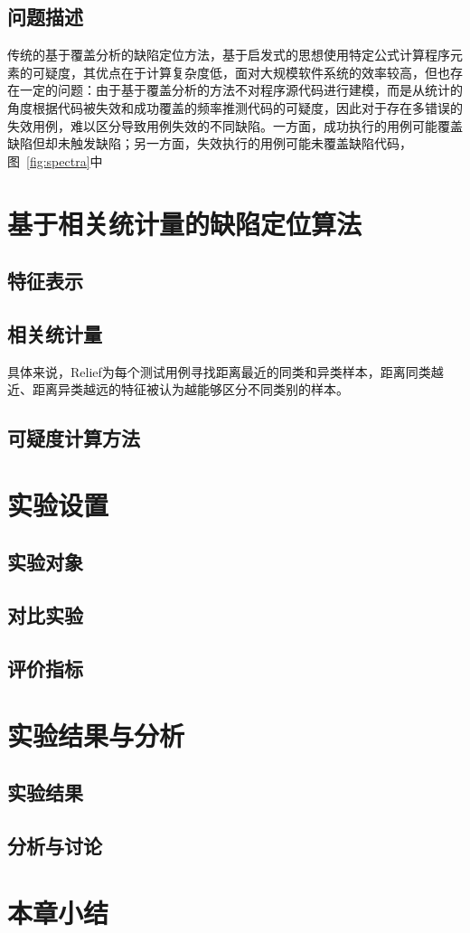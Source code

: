 \subsection{问题描述}
传统的基于覆盖分析的缺陷定位方法，基于启发式的思想使用特定公式计算程序元素的可疑度，其优点在于计算复杂度低，面对大规模软件系统的效率较高，但也存在一定的问题：由于基于覆盖分析的方法不对程序源代码进行建模，而是从统计的角度根据代码被失效和成功覆盖的频率推测代码的可疑度，因此对于存在多错误的失效用例，难以区分导致用例失效的不同缺陷。一方面，成功执行的用例可能覆盖缺陷但却未触发缺陷；另一方面，失效执行的用例可能未覆盖缺陷代码，图~\ref{fig:spectra}中



\section{基于相关统计量的缺陷定位算法}
\subsection{特征表示}
\subsection{相关统计量}
具体来说，Relief为每个测试用例寻找距离最近的同类和异类样本，距离同类越近、距离异类越远的特征被认为越能够区分不同类别的样本。
\subsection{可疑度计算方法}
\section{实验设置}
\subsection{实验对象}
\subsection{对比实验}
\subsection{评价指标}
\section{实验结果与分析}
\subsection{实验结果}
\subsection{分析与讨论}
\section{本章小结}
